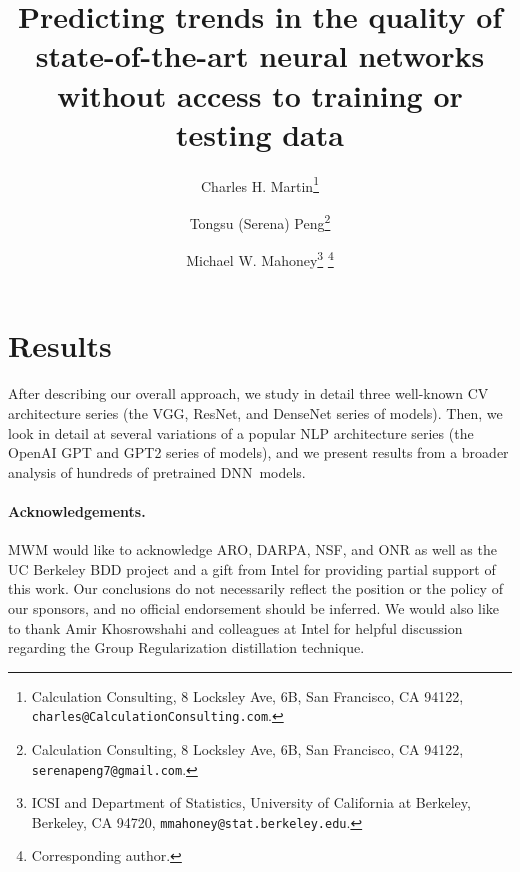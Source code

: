 \documentclass[11pt]{article}
\begin{document}
\title{%
Predicting trends in the quality of state-of-the-art neural networks without access to training or testing data
}

\author{%
Charles H. Martin\thanks{Calculation Consulting, 8 Locksley Ave, 6B, San Francisco, CA 94122, \texttt{charles@CalculationConsulting.com}.} 
\and 
Tongsu (Serena) Peng\thanks{Calculation Consulting, 8 Locksley Ave, 6B, San Francisco, CA 94122, \texttt{serenapeng7@gmail.com}.}
\and
Michael W. Mahoney\thanks{ICSI and Department of Statistics, University of California at Berkeley, Berkeley, CA 94720, \texttt{mmahoney@stat.berkeley.edu}.}
\thanks{Corresponding author.}
}

\date{}
\maketitle



\begin{abstract}

\end{abstract}




\section{Results}
After describing our overall approach, we study in detail three well-known CV architecture series (the VGG, ResNet, and DenseNet series of models).
Then, we look in detail at several variations of a popular NLP architecture series (the OpenAI GPT and GPT2 series of models), and we present results from a broader analysis of hundreds of pretrained DNN~models.











\noindent
\paragraph{Acknowledgements.}
MWM would like to acknowledge ARO, DARPA, NSF, and ONR as well as the UC Berkeley BDD project and a gift from Intel for providing partial support of this work.
Our conclusions do not necessarily reflect the position or the policy of our sponsors, and no official endorsement should be inferred.
We would also like to thank Amir Khosrowshahi and colleagues at Intel for helpful discussion regarding the Group Regularization distillation technique.


%
{\small
%

%
}

\appendix

\end{document}

